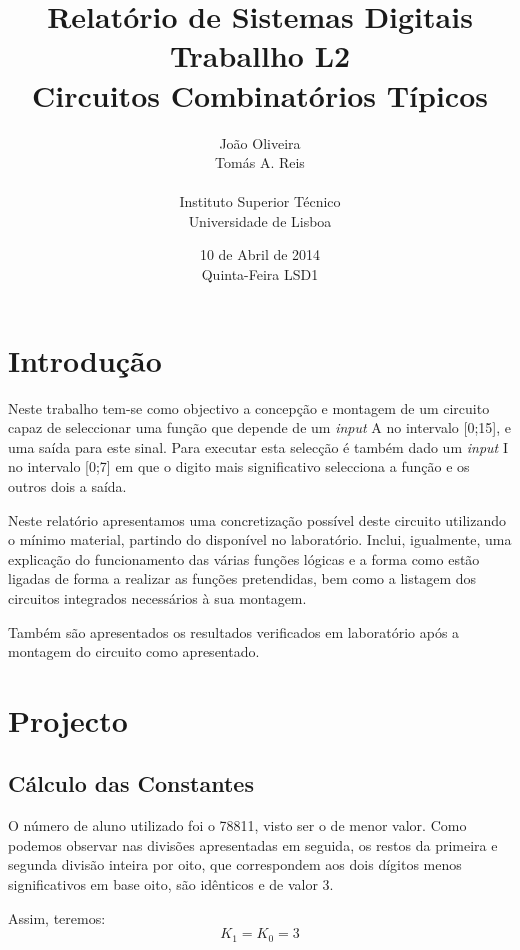 \documentclass[a4paper,12pt]{article}
\begin{document}
\renewcommand{\sfdefault}{lmss}
\renewcommand{\familydefault}{\sfdefault}
\selectfont

\title{\bf Relatório de Sistemas Digitais \\
Traballho L2\\
Circuitos Combinatórios Típicos}
\author{João Oliveira\\
Tomás A. Reis\\
\\
Instituto Superior Técnico \\
Universidade de Lisboa}
\date{10 de Abril de 2014 \\
Quinta-Feira LSD1}
\maketitle

\pagebreak
\section{Introdução}
Neste trabalho tem-se como objectivo a concepção e montagem de um circuito 
capaz de seleccionar uma função que depende de um {\it input} A no intervalo 
[0;15], e uma saída para este sinal. Para executar esta selecção é também 
dado um {\it input} I no intervalo [0;7] em que o digito mais significativo 
selecciona a função e os outros dois a saída. 
\par
Neste relatório apresentamos uma concretização possível deste circuito 
utilizando o mínimo material, partindo do disponível no laboratório. Inclui, 
igualmente, uma explicação do funcionamento das várias funções lógicas e 
a forma como estão ligadas de forma a realizar as funções pretendidas, bem 
como a listagem dos circuitos integrados necessários à sua montagem.
\par
Também são apresentados os resultados verificados em laboratório após a 
montagem do circuito como apresentado.

\section{Projecto}
\subsection{Cálculo das Constantes}
O número de aluno utilizado foi o 78811, visto ser o de menor valor. Como 
podemos observar nas divisões apresentadas em seguida, os restos da primeira e 
segunda divisão inteira por oito, que correspondem aos dois dígitos menos 
significativos em base oito, são idênticos e de valor 3. 
\par
\vspace*{1\baselineskip}
\hspace{20pt}  \hspace{60pt} 
\vspace*{1\baselineskip}
\par
Assim, teremos:
\begin{equation}
K_1=K_0=3
\end{equation}
\end{document}
